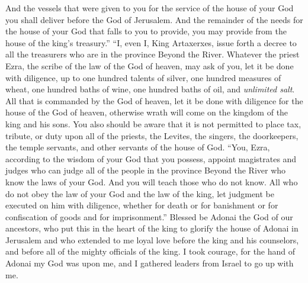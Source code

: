 \begin{biblechapter}
\verse And the vessels that were given to you for the service of the house of your God you shall deliver before the God of Jerusalem.
\verse And the remainder of the needs for the house of your God that falls to you to provide, you may provide from the house of the king’s treasury.”
\verse “I, even I, King Artaxerxes, issue forth a decree to all the treasurers who are in the province Beyond the River. Whatever the priest Ezra, the scribe of the law of the God of heaven, may ask of you, let it be done with diligence,
\verse up to one hundred talents of silver, one hundred measures of wheat, one hundred baths of wine, one hundred baths of oil, and \textit{unlimited salt}.
\verse All that is commanded by the God of heaven, let it be done with diligence for the house of the God of heaven, otherwise wrath will come on the kingdom of the king and his sons.
\verse You also should be aware that it is not permitted to place tax, tribute, or duty upon all of the priests, the Levites, the singers, the doorkeepers, the temple servants, and other servants of the house of God.
\verse “You, Ezra, according to the wisdom of your God that you possess, appoint magistrates and judges who can judge all of the people in the province Beyond the River who know the laws of your God. And you will teach those who do not know.
\verse All who do not obey the law of your God and the law of the king, let judgment be executed on him with diligence, whether for death or for banishment or for confiscation of goods and for imprisonment.”
\verse Blessed be Adonai the God of our ancestors, who put this in the heart of the king to glorify the house of Adonai in Jerusalem
\verse and who extended to me loyal love before the king and his counselors, and before all of the mighty officials of the king. I took courage, for the hand of Adonai my God was upon me, and I gathered leaders from Israel to go up with me.
\end{biblechapter}

